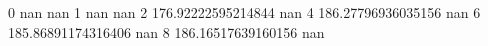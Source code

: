 0 nan nan
1 nan nan
2 176.92222595214844 nan
4 186.27796936035156 nan
6 185.86891174316406 nan
8 186.16517639160156 nan

